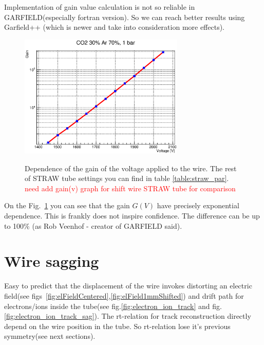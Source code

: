 \documentclass[]{article}
\begin{document}
	Implementation of gain value calculation is not so reliable in GARFIELD(especially fortran version). So we can reach better results using Garfield++ (which is newer and take into consideration more effects).
	
	\begin{figure}[h!]
	\centering
	\includegraphics[width=0.7\textwidth]{gain_1450_2050V}
	\label{fig:gainVoltage}	
	\caption{Dependence of the gain of the voltage applied to the wire. The rest of STRAW tube settings you can find in table \ref{table:straw_par}. \textcolor{red}{need add gain(v) graph for shift wire STRAW tube for comparison} }
	\end{figure}

	On the Fig.~\ref{fig:gainVoltage} you can see that the gain $G(V)$ have precisely exponential dependence. This is frankly does not inspire confidence. The difference can be up to 100\% (as Rob Veenhof - creator of GARFIELD \cite{garfield} said).
	
	\section{ Wire sagging}
	Easy to predict that the displacement of the wire invokes distorting an electric field(see figs~\ref{fig:elFieldCentered},\ref{fig:elField1mmShifted}) and drift path for electrons/ions inside the tube(see fig.\ref{fig:electron_ion_track} and fig.\ref{fig:electron_ion_track_sag}). The rt-relation for track reconstruction directly depend on the wire position in the tube. So rt-relation lose it's previous symmetry(see next sections).
	
\end{document}
